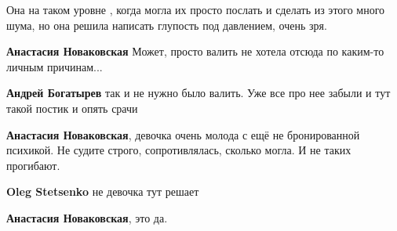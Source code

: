 \begin{itemize}
Она на таком уровне , когда могла их просто послать и сделать из этого много
шума, но она решила написать глупость под давлением, очень зря.


\begin{itemize}
 
\textbf{Анастасия Новаковская} Может, просто валить не хотела отсюда по каким-то личным причинам...

 
\textbf{Андрей Богатырев} так и не нужно было валить. Уже все про нее забыли и тут такой постик и опять срачи

 
\textbf{Анастасия Новаковская}, девочка очень молода с ещё не бронированной психикой. Не судите строго, сопротивлялась, сколько могла. И не таких прогибают.

 
\textbf{Oleg Stetsenko} не девочка тут решает

 
\textbf{Анастасия Новаковская}, это да.

 

\end{itemize}
\end{itemize}

